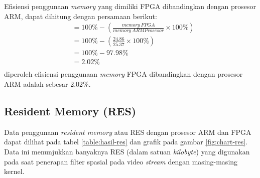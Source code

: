 Efisiensi penggunaan \textit{memory} yang dimiliki FPGA dibandingkan dengan prosesor ARM, dapat dihitung dengan persamaan berikut:
\begin{equation*}
    \begin{split}
& = 100\% - \left( \frac{memory\ FPGA}{memory\ ARM Prosesor} \times 100\% \right) \\
& = 100\% - \left( \frac{24.86}{25.37} \times 100\% \right) \\
& = 100\% - 97.98\% \\
& = 2.02\% \\
    \end{split}
\end{equation*}
diperoleh efisiensi penggunaan \textit{memory} FPGA dibandingkan dengan prosesor ARM adalah sebesar 2.02\%.


\subsection{Resident Memory (RES)}
Data penggunaan \textit{resident memory} atau RES dengan prosesor ARM dan FPGA dapat dilihat pada tabel \ref{table:hasil-res} dan grafik pada gambar \ref{fig:chart-res}. Data ini menunjukkan banyaknya RES (dalam satuan \textit{kilobyte}) yang digunakan pada saat penerapan filter spasial pada video \textit{stream} dengan masing-masing kernel.

